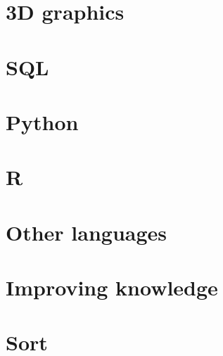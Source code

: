 \documentclass[oneside]{book}
\begin{document}
\part{3D graphics}







\part{SQL}




\part{Python}







\part{R}










\part{Other languages}


\part{Improving knowledge}



\part{Sort}

\end{document}

